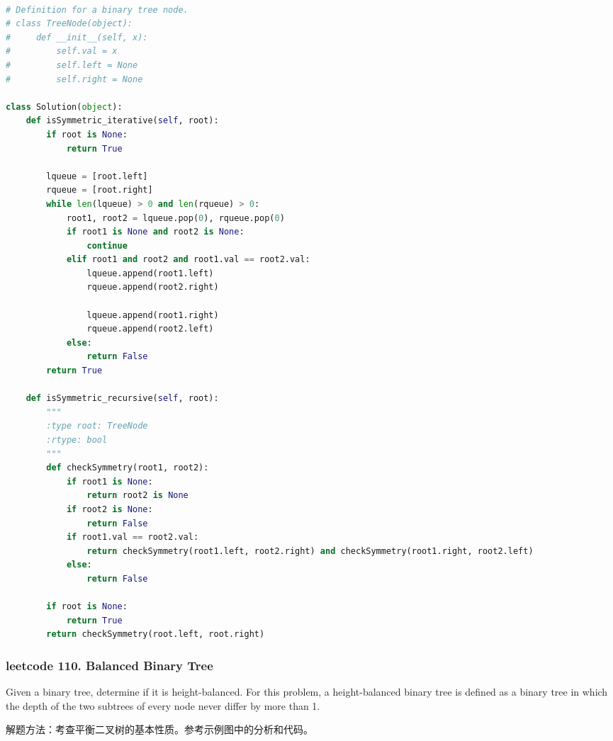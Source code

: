 \documentclass[a4paper,10pt]{article}
\begin{document}
\begin{lstlisting}[language=Python, caption=Problem101. Symmetric Tree]

# Definition for a binary tree node.
# class TreeNode(object):
#     def __init__(self, x):
#         self.val = x
#         self.left = None
#         self.right = None

class Solution(object):
    def isSymmetric_iterative(self, root):
        if root is None:
            return True

        lqueue = [root.left]
        rqueue = [root.right]
        while len(lqueue) > 0 and len(rqueue) > 0:
            root1, root2 = lqueue.pop(0), rqueue.pop(0)
            if root1 is None and root2 is None:
                continue
            elif root1 and root2 and root1.val == root2.val:
                lqueue.append(root1.left)
                rqueue.append(root2.right)

                lqueue.append(root1.right)
                rqueue.append(root2.left)
            else:
                return False
        return True

    def isSymmetric_recursive(self, root):
        """
        :type root: TreeNode
        :rtype: bool
        """
        def checkSymmetry(root1, root2):
            if root1 is None: 
                return root2 is None
            if root2 is None:
                return False
            if root1.val == root2.val:
                return checkSymmetry(root1.left, root2.right) and checkSymmetry(root1.right, root2.left)
            else:
                return False

        if root is None:
            return True
        return checkSymmetry(root.left, root.right)
\end{lstlisting}


\subsubsection{leetcode 110. Balanced Binary Tree}
Given a binary tree, determine if it is height-balanced. For this problem, a height-balanced binary tree is defined as a binary tree in which the depth of the two subtrees of every node never differ by more than 1.\\

\begin{CJK*}{UTF8}{gbsn}
\noindent 解题方法：考查平衡二叉树的基本性质。参考示例图中的分析和代码。
\end{CJK*}
\end{document}
